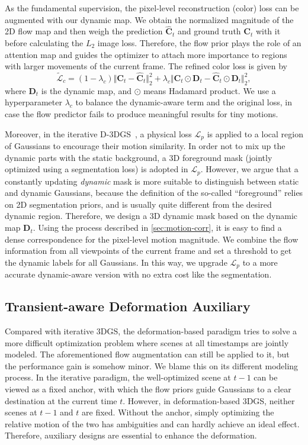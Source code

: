 \documentclass[runningheads]{llncs}
\begin{document}
As the fundamental supervision, the pixel-level reconstruction (color) loss can be augmented with our dynamic map. We obtain the normalized magnitude of the 2D flow map and then weigh the prediction $\hat{\mathbf{C}}_t$ and ground truth $\mathbf{C}_t$ with it before calculating the $L_2$ image loss. Therefore, the flow prior plays the role of an attention map and guides the optimizer to attach more importance to regions with larger movements of the current frame. The refined color loss is given by
%
\begin{equation}
    \widetilde{\mathcal{L}}_{c}=
    (1-\lambda_c) \Vert\mathbf{C}_t - \hat{\mathbf{C}}_t\Vert_2^2 + \lambda_c \Vert\mathbf{C}_t \odot \mathbf{D}_t - \hat{\mathbf{C}}_t \odot \mathbf{D}_t\Vert_2^2,
\end{equation}
%
where $\mathbf{D}_t$ is the dynamic map, and $\odot$ means Hadamard product. We use a hyperparameter $\lambda_c$ to balance the dynamic-aware term and the original loss, in case the flow predictor fails to produce meaningful results for tiny motions.

Moreover, in the iterative D-3DGS~\cite{d3dgs}, a physical loss $\mathcal{L}_{p}$ is applied to a local region of Gaussians to encourage their motion similarity.
In order not to mix up the dynamic parts with the static background, a 3D foreground mask (jointly optimized using a segmentation loss) is adopted in $\mathcal{L}_{p}$. However, we argue that a constantly updating \textit{dynamic} mask is more suitable to distinguish between static and dynamic Gaussians, because the definition of the so-called ``foreground'' relies on 2D segmentation priors, and is usually quite different from the desired dynamic region. Therefore, we design a 3D dynamic mask based on the dynamic map $\mathbf{D}_t$. Using the process described in \cref{sec:motion-corr}, it is easy to find a dense correspondence for the pixel-level motion magnitude. We combine the flow information from all viewpoints of the current frame and set a threshold to get the dynamic labels for all Gaussians. In this way, we upgrade $\mathcal{L}_{p}$ to a more accurate dynamic-aware version with no extra cost like the segmentation.

\subsection{Transient-aware Deformation Auxiliary}
\label{sec:deform}

Compared with iterative 3DGS, the deformation-based paradigm tries to solve a more difficult optimization problem where scenes at all timestamps are jointly modeled. The aforementioned flow augmentation can still be applied to it, but the performance gain is somehow minor. We blame this on its different modeling process. In the iterative paradigm, the well-optimized scene at $t-1$ can be viewed as a fixed anchor, with which the flow priors guide Gaussians to a clear destination at the current time $t$. However, in deformation-based 3DGS, neither scenes at $t-1$ and $t$ are fixed. Without the anchor, simply optimizing the relative motion of the two has ambiguities and can hardly achieve an ideal effect. Therefore, auxiliary designs are essential to enhance the deformation.
\end{document}
